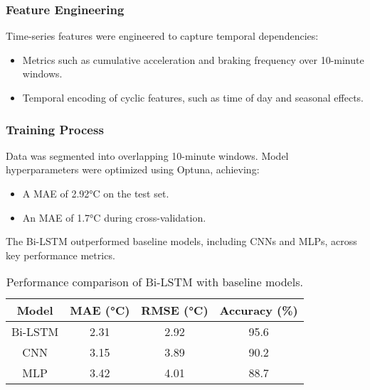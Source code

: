 \subsubsection{Feature Engineering}
Time-series features were engineered to capture temporal dependencies:
\begin{itemize}
    \item Metrics such as cumulative acceleration and braking frequency over 10-minute windows.
    \item Temporal encoding of cyclic features, such as time of day and seasonal effects.
\end{itemize}

\subsubsection{Training Process}
Data was segmented into overlapping 10-minute windows. Model hyperparameters were optimized using Optuna, achieving:
\begin{itemize}
    \item A \gls{MAE} of 2.92°C on the test set.
    \item An \gls{MAE} of 1.7°C during cross-validation.
\end{itemize}
The \gls{Bi-LSTM} outperformed baseline models, including \glspl{CNN} and \glspl{MLP}, across key performance metrics.


\begin{table}[ht]
    \centering
    \caption{Performance comparison of \gls{Bi-LSTM} with baseline models.}
    \label{tab:model_performance}
    \begin{tabular}{|c|c|c|c|}
        \hline
        Model & MAE (°C) & RMSE (°C) & Accuracy (\%) \\ \hline
        \gls{Bi-LSTM} & 2.31 & 2.92 & 95.6 \\ \hline
        \gls{CNN} & 3.15 & 3.89 & 90.2 \\ \hline
        MLP & 3.42 & 4.01 & 88.7 \\ \hline
    \end{tabular}
\end{table}

